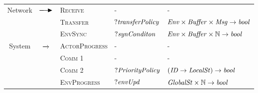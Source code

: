 \begin{table}[]
\begin{tabular}{|c|c|l|l|l|}
		\multirow{3}{*}{Network} & \multirow{3}{*}{$\noverto{}$}         & \textsc{Receive}                 &       -       &    -  \\ \cline{3-5} 
		&                           & \textsc{Transfer}                &      $?{\it transferPolicy}$        &  $\mathit{Env}\times \mathit{Buffer}\times \mathit{Msg}\rightarrow \mathit{bool}$    \\ \cline{3-5} 
		&                           & \textsc{EnvSync}                 &       $?{\it synConditon}$         &   $\mathit{Env}\times \mathit{Buffer}\times \mathbb{N}\rightarrow \mathit{bool}$   \\ \hline
		\multirow{4}{*}{System} & \multirow{4}{*}{$\overto{}$}         & \textsc{ActorProgress}           &      -        &    -  \\ \cline{3-5} 
		&                           & \textsc{Comm 1}                  &      -        &   -   \\ \cline{3-5} 
		&                           & \textsc{Comm 2}                  &     $?{\it PriorityPolicy}$         &   $(\mathit{ID}\rightarrow \mathit{LocalSt})\rightarrow \mathit{bool}$   \\ \cline{3-5} 
		&                           & \textsc{EnvProgress}             &     $?{\it envUpd}$        &   $\mathit{GlobalSt}\times \mathbb{N}\rightarrow \mathit{bool} $   \\ \hline
	\end{tabular}
	
\end{table}